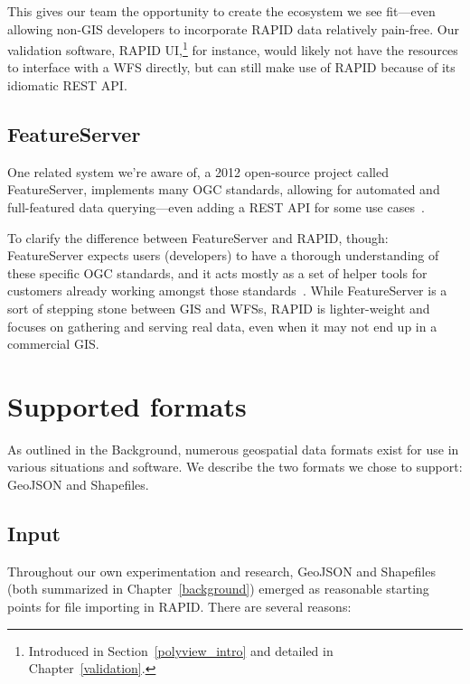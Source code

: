 This gives our team the opportunity to create the ecosystem we see fit---even allowing non-GIS developers to incorporate RAPID data relatively pain-free. Our validation software, RAPID UI,\footnote{Introduced in Section~\ref{polyview_intro} and detailed in Chapter~\ref{validation}.} for instance, would likely not have the resources to interface with a WFS directly, but can still make use of RAPID because of its idiomatic REST API.

\subsection{FeatureServer}

One related system we're aware of, a 2012 open-source project called FeatureServer, implements many OGC standards, allowing for automated and full-featured data querying---even adding a REST API for some use cases~\cite{FeatureServ}.

To clarify the difference between FeatureServer and RAPID, though: FeatureServer expects users (developers) to have a thorough understanding of these specific OGC standards, and it acts mostly as a set of helper tools for customers already working amongst those standards~\cite{FeatureServ}. While FeatureServer is a sort of stepping stone between GIS and WFSs, RAPID is lighter-weight and focuses on gathering and serving real data, even when it may not end up in a commercial GIS.

\section{Supported formats}
As outlined in the Background, numerous geospatial data formats exist for use in various situations and software. We describe the two formats we chose to support: GeoJSON and Shapefiles.

\subsection{Input}

Throughout our own experimentation and research, GeoJSON and Shapefiles (both summarized in Chapter~\ref{background}) emerged as reasonable starting points for file importing in RAPID. There are several reasons:

